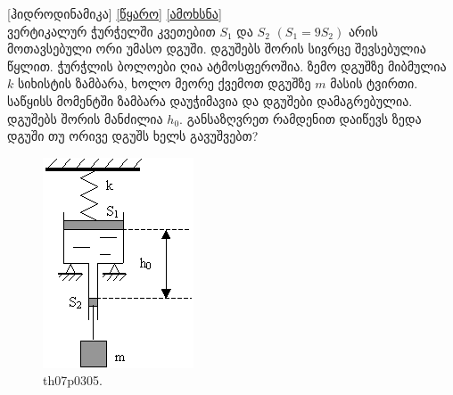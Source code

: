 \documentclass{article}
\begin{document}
[ჰიდროდინამიკა] \href{https://www.physolymp.spb.ru/index.php/archive/2003/245}{[წყარო]} \href{https://www.physolymp.spb.ru/index.php/archive/2003/240}{[ამოხსნა]} \\
ვერტიკალურ ჭურჭელში კვეთებით $S_1$ და $S_2$ $(S_1=9S_2)$ არის მოთავსებული ორი უმასო დგუში. დგუშებს შორის სივრცე შევსებულია წყლით. ჭურჭლის ბოლოები ღია ატმოსფეროშია. ზემო დგუშზე მიბმულია $k$ სიხისტის ზამბარა, ხოლო მეორე ქვემოთ დგუშზე $m$ მასის ტვირთი. საწყისს მომენტში ზამბარა დაუჭიმავია და დგუშები დამაგრებულია. დგუშებს შორის მანძილია $h_0$. განსაზღვრეთ რამდენით დაიწევს ზედა დგუში თუ ორივე დგუშს ხელს გავუშვებთ?
	\begin{figure}[H]
		\centering
		\includegraphics[width=0.2\columnwidth]{images/th07p_03_5}
		\caption{th07p0305.}
		\label{fig:th07p_03_5}
	\end{figure}
\end{document}

